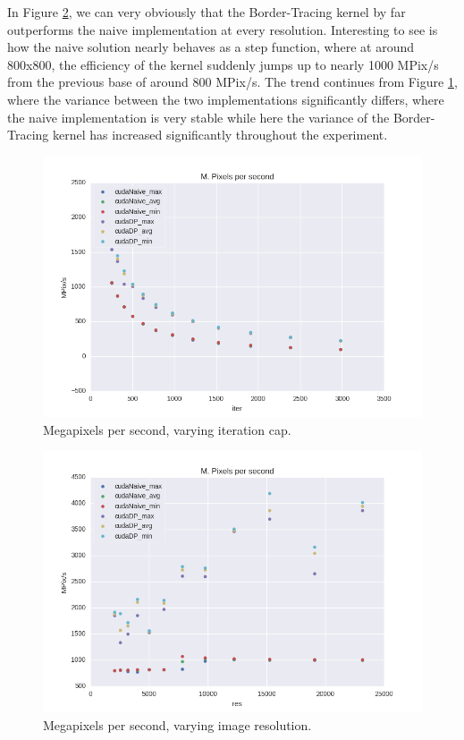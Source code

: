 \documentclass[letterpaper]{article}
\begin{document}
\begin{multicols}{2}
In Figure \ref{fig:mppsRes}, we can very obviously that the Border-Tracing
  kernel by far outperforms the naive implementation at every resolution.
  Interesting to see is how the naive solution nearly behaves as a step
  function, where at around 800x800, the efficiency of the kernel suddenly jumps
  up to nearly 1000 MPix/s from the previous base of around 800 MPix/s.
The trend continues from Figure \ref{fig:mppsIter}, where the variance between
  the two implementations significantly differs, where the naive implementation
  is very stable while here the variance of the Border-Tracing kernel has
  increased significantly throughout the experiment.

\begin{figure}[H]
  \includegraphics[width=\linewidth]{../experiments3/mpps_graph_exp_iter.png}
  \caption{Megapixels per second, varying iteration cap.}
  \label{fig:mppsIter}
\end{figure}

\begin{figure}[H]
  \includegraphics[width=\linewidth]{../experiments3/mpps_graph_exp_res.png}
  \caption{Megapixels per second, varying image resolution.}
  \label{fig:mppsRes}
\end{figure}




\end{multicols}
\end{document}
